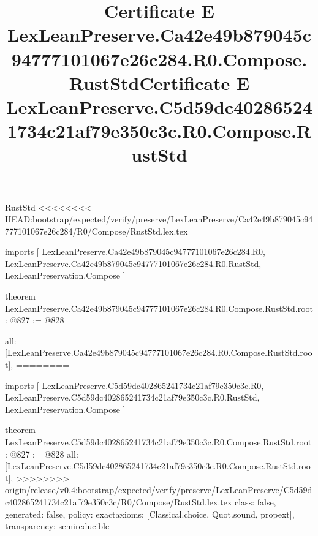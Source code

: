 \begin{lexlean}{RustStd}
<<<<<<<< HEAD:bootstrap/expected/verify/preserve/LexLeanPreserve/Ca42e49b879045c94777101067e26c284/R0/Compose/RustStd.lex.tex
\title{Certificate E LexLeanPreserve.Ca42e49b879045c94777101067e26c284.R0.Compose.RustStd}
\begin{coremodule}
imports [
  LexLeanPreserve.Ca42e49b879045c94777101067e26c284.R0,
  LexLeanPreserve.Ca42e49b879045c94777101067e26c284.R0.RustStd,
  LexLeanPreservation.Compose
]

theorem LexLeanPreserve.Ca42e49b879045c94777101067e26c284.R0.Compose.RustStd.root : @827 := @828 {
  all: [LexLeanPreserve.Ca42e49b879045c94777101067e26c284.R0.Compose.RustStd.root],
========
\title{Certificate E LexLeanPreserve.C5d59dc402865241734c21af79e350c3c.R0.Compose.RustStd}
\begin{coremodule}
imports [
  LexLeanPreserve.C5d59dc402865241734c21af79e350c3c.R0,
  LexLeanPreserve.C5d59dc402865241734c21af79e350c3c.R0.RustStd,
  LexLeanPreservation.Compose
]

theorem LexLeanPreserve.C5d59dc402865241734c21af79e350c3c.R0.Compose.RustStd.root : @827 := @828 {
  all: [LexLeanPreserve.C5d59dc402865241734c21af79e350c3c.R0.Compose.RustStd.root],
>>>>>>>> origin/release/v0.4:bootstrap/expected/verify/preserve/LexLeanPreserve/C5d59dc402865241734c21af79e350c3c/R0/Compose/RustStd.lex.tex
  class: false,
  generated: false,
  policy: exact{axioms: [Classical.choice, Quot.sound, propext]},
  transparency: semireducible
}


\end{coremodule}}
\end{coremodule}
\end{lexlean}
